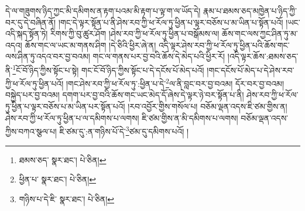 དེ་ལ་གཟུགས་ཉིད་ཀྱང་མི་དམིགས་ན་རྟག་པའམ་མི་རྟག་པ་ལྟ་ག་ལ་ཡོད་དེ། རྣམ་པ་ཐམས་ཅད་མཁྱེན་པ་ཉིད་ཀྱི་བར་དུ་དེ་བཞིན་ནོ། །གང་དེ་ལྟར་སྟོན་པ་ནི་ཤེས་རབ་ཀྱི་ཕ་རོལ་ཏུ་ཕྱིན་པ་ལྟར་བཅོས་པ་མ་ཡིན་པ་སྟོན་པའོ། །ཡང་འདི་སྐད་སྟོན་ཏེ། རིགས་ཀྱི་བུ་ཚུར་ཤོག །ཤེས་རབ་ཀྱི་ཕ་རོལ་ཏུ་ཕྱིན་པ་བསྒོམས་ལ། ཆོས་གང་ལས་ཀྱང་ཤིན་ཏུ་མ་འདའ། ཆོས་གང་ལ་ཡང་མ་གནས་ཤིག །དེ་ཅིའི་ཕྱིར་ཞེ་ན། འདི་ལྟར་ཤེས་རབ་ཀྱི་ཕ་རོལ་ཏུ་ཕྱིན་པའི་ཆོས་གང་ལས་ཤིན་ཏུ་འདའ་བར་བྱ་བའམ། གང་ལ་གནས་པར་བྱ་བའི་ཆོས་དེ་མེད་པའི་ཕྱིར་རོ། །འདི་ལྟར་ཆོས་:ཐམས་ཅད་ནི་\footnote{ཐམས་ཅད་  སྣར་ཐང་།  པེ་ཅིན། }ངོ་བོ་ཉིད་ཀྱིས་སྟོང་པ་སྟེ། གང་ངོ་བོ་ཉིད་ཀྱིས་སྟོང་པ་དེ་དངོས་པོ་མེད་པའོ། །གང་དངོས་པོ་མེད་པ་དེ་ཤེས་རབ་ཀྱི་ཕ་རོལ་ཏུ་ཕྱིན་པའོ། །གང་ཤེས་རབ་ཀྱི་ཕ་རོལ་ཏུ་:ཕྱིན་པ་དེ་\footnote{ཕྱིན་པ་  སྣར་ཐང་།  པེ་ཅིན། }ལ་ནི་བླང་བར་བྱ་བའམ། དོར་བར་བྱ་བའམ། བསྐྱེད་པར་བྱ་བའམ། དགག་པར་བྱ་བའི་ཆོས་གང་ཡང་མེད་དོ་ཞེས་དེ་ལྟར་ཉེ་བར་སྟོན་པ་ནི། ཤེས་རབ་ཀྱི་ཕ་རོལ་ཏུ་ཕྱིན་པ་ལྟར་བཅོས་པ་མ་ཡིན་པར་སྟོན་པའོ། །རབ་འབྱོར་གྱིས་གསོལ་པ། བཅོམ་ལྡན་འདས་ཇི་ཙམ་གྱིས་ན། ཤེས་རབ་ཀྱི་ཕ་རོལ་ཏུ་ཕྱིན་པ་ལ་དམིགས་པ་ལགས། ཇི་ཙམ་གྱིས་ན་མི་དམིགས་པ་ལགས། བཅོམ་ལྡན་འདས་ཀྱིས་བཀའ་སྩལ་པ། ཇི་ཙམ་དུ་:ན་གཉིས་པོ་དེ་\footnote{གཉིས་པ་དེ་ཇི་  སྣར་ཐང་།  པེ་ཅིན། }ཙམ་དུ་དམིགས་པའོ། །
